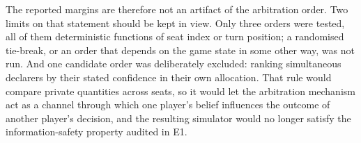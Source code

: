 The reported margins are therefore not an artifact of the arbitration order.
Two limits on that statement should be kept in view. Only three orders were
tested, all of them deterministic functions of seat index or turn position; a
randomised tie-break, or an order that depends on the game state in some other
way, was not run. And one candidate order was deliberately excluded: ranking
simultaneous declarers by their stated confidence in their own allocation. That
rule would compare private quantities across seats, so it would let the
arbitration mechanism act as a channel through which one player's belief
influences the outcome of another player's decision, and the resulting simulator
would no longer satisfy the information-safety property audited in E1.
